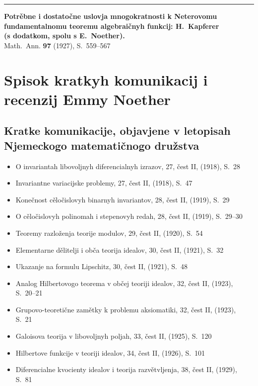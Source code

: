\documentclass[11pt]{article}
\newcommand{\foreign}[1]{#1}
\begin{document}
\vspace{1em}
\noindent\rule{\textwidth}{0.4pt}
\vspace{0.5em}

\noindent\textbf{Potrěbne i dostatočne uslovja mnogokratnosti k Neterovomu}\\
\textbf{fundamentalnomu teoremu algebraičnyh funkcij: H.\ Kapferer}\\
\textbf{(s dodatkom, spolu s E.\ Noether).}\\
\foreign{Math.\ Ann.} \textbf{97} (1927), S.~559--567

\newpage
\section*{Spisok kratkyh komunikacij i recenzij Emmy Noether}

\subsection*{Kratke komunikacije, objavjene v letopisah Njemeckogo matematičnogo družstva}

\begin{itemize}[leftmargin=1.5em,itemsep=0.2em]
\item O invariantah libovoljnyh diferencialnyh izrazov, 27, čest II, (1918), S.~28
\item Invariantne variacijske problemy, 27, čest II, (1918), S.~47
\item Konečnost cěločislovyh binarnyh invariantov, 28, čest II, (1919), S.~29
\item O cěločislovyh polinomah i stepenovyh redah, 28, čest II, (1919), S.~29--30
\item Teoremy razloženja teorije modulov, 29, čest II, (1920), S.~54
\item Elementarne dělitelji i obča teorija idealov, 30, čest II, (1921), S.~32
\item Ukazanje na formulu Lipschitz, 30, čest II, (1921), S.~48
\item Analog Hilbertovogo teorema v občej teoriji idealov, 32, čest II, (1923), S.~20--21
\item Grupovo-teoretične zamětky k problemu aksiomatiki, 32, čest II, (1923), S.~21
\item Galoisova teorija v libovoljnyh poljah, 33, čest II, (1925), S.~120
\item Hilbertove funkcije v teoriji idealov, 34, čest II, (1926), S.~101
\item Diferencialne kvocienty idealov i teorija razvětvljenja, 38, čest II, (1929), S.~81
\end{itemize}
\end{document}
